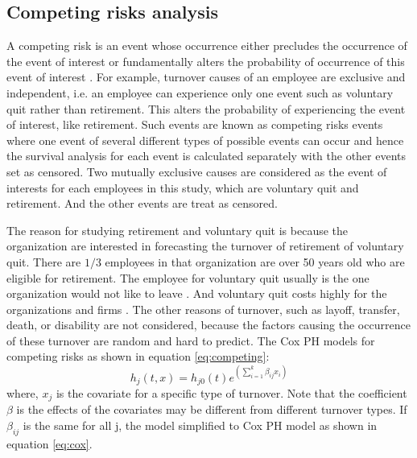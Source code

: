 \subsection{Competing risks analysis}
A competing risk is an event whose occurrence either precludes the occurrence of the event of interest or fundamentally alters the probability of occurrence of this event of interest \citep{tableman2003}. For example, turnover causes of an employee are exclusive and independent, i.e. an employee can experience only one event such as voluntary quit rather than retirement. This alters the probability of experiencing the event of interest, like retirement. Such events are known as competing risks events where one event of several different types of possible events can occur and hence the survival analysis for each event is calculated separately with the other events set as censored. Two mutually exclusive causes are considered as the event of interests for each employees in this study, which are voluntary quit and retirement. And the other events are treat as censored.

The reason for studying retirement and voluntary quit is because the organization are interested in forecasting the turnover of retirement of voluntary quit. There are $1/3$  employees in that organization are over 50 years old who are eligible for retirement. The employee for voluntary quit usually is the one organization would not like to leave \citep{allen2010}. And voluntary quit costs highly for the organizations and firms \citep{selden2000}. The other reasons of turnover, such as layoff, transfer, death, or disability are not considered, because the factors causing the occurrence of these turnover are random and hard to predict. The Cox PH models for competing risks as shown in equation \ref{eq:competing}:
\begin{equation}
\label{eq:competing}
h_j(t,x)=h_{j0}(t)e^{(\sum_{i=1}^{k}\beta_{ij}x_i)}
\end{equation}
where, $x_{j}$ is the covariate for a specific type of turnover. Note that the coefficient $\beta$ is the effects of the covariates may be different from different turnover types. If $\beta_{ij}$  is the same for all j, the model simplified to Cox PH model as shown in equation \ref{eq:cox}. 
